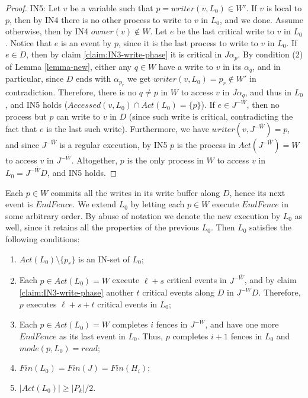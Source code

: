 \begin{proof}
	IN5: Let $v$ be a variable such that $p = writer(v,L_0) \in W'$. If $v$ is local to $p$, then by IN4 there is no other process to write to $v$ in $L_0$, and we done. Assume otherwise, then by IN4 $owner(v) \notin W$. Let $e$ be the last critical write to $v$ in $L_0$. Notice that $e$ is an event by $p$, since it is the last process to write to $v$ in $L_0$.
	If $e \in D$, then by claim \ref{claim:IN3-write-phase} it is critical in $J \alpha_p$. By condition (2) of Lemma \ref{lemma-new}, either any $q \in W$ have a write to $v$ in its $\alpha_q$, and in particular, since $D$ ends with $\alpha_{p_r}$ we get $writer(v,L_0) = p_r \notin W'$ in contradiction. Therefore, there is no $q \neq p$ in $W$ to access $v$ in $J \alpha_q$, and thus in $L_0$, and IN5 holds ($Accessed(v,L_0) \cap Act(L_0) =\{p\}$).
	If $e \in J^{-\overline{W}}$, then no process but $p$ can write to $v$ in $D$ (since such write is critical, contradicting the fact that $e$ is the last such write). Furthermore, we have $writer(v,J^{-\overline{W}}) = p$, and since $J^{-\overline{W}}$ is a regular execution, by IN5 $p$ is the process in $Act(J^{-\overline{W}}) = W$ to access $v$ in $J^{-\overline{W}}$. Altogether, $p$ is the only process in $W$ to access $v$ in $L_0 = J^{-\overline{W}} D$, and IN5 holds.
\end{proof}

Each $p \in W$ commits all the writes in its write buffer along $D$, hence its next event is $EndFence$. We extend $L_0$ by letting each $p \in W$ execute $EndFence$ in some arbitrary order. By abuse of notation we denote the new execution by $L_0$ as well, since it retains all the properties of the previous $L_0$. Then $L_0$ satisfies the following conditions:
\begin{enumerate}
	\item $Act(L_0) \setminus \{p_r\}$ is an IN-set of $L_0$;
	\item Each $p \in Act(L_0) = W$ execute $\ell+s$ critical events in $J^{-\overline{W}}$, and by claim \ref{claim:IN3-write-phase} another $t$ critical events along $D$ in $J^{-\overline{W}} D$. Therefore, $p$ executes $\ell+s+t$ critical events in $L_0$;
	\item Each $p \in Act(L_0) = W$ completes $i$ fences in $J^{-\overline{W}}$, and have one more $EndFence$ as its last event in $L_0$. Thus, $p$ completes $i+1$ fences in $L_0$ and $mode(p,L_0) = read$;
	\item $Fin(L_0) = Fin(J) = Fin(H_i)$;
	\item $|Act(L_0)| \geq |P_k|/2$.
\end{enumerate}

